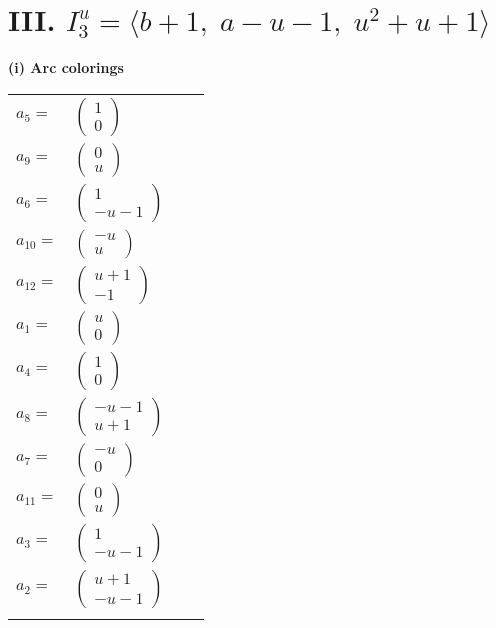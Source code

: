 \documentclass[1p]{elsarticle_modified}
\theoremstyle{definition}
\begin{document}
\centering \section*{III. $I^u_{3}= \langle b+1,\;a- u-1,\;u^2+u+1 \rangle$}
\flushleft \textbf{(i) Arc colorings}\\
\begin{tabular}{m{7pt} m{180pt} m{7pt} m{180pt} }
\flushright $a_{5}=$&$\begin{pmatrix}1\\0\end{pmatrix}$ \\
\flushright $a_{9}=$&$\begin{pmatrix}0\\u\end{pmatrix}$ \\
\flushright $a_{6}=$&$\begin{pmatrix}1\\- u-1\end{pmatrix}$ \\
\flushright $a_{10}=$&$\begin{pmatrix}- u\\u\end{pmatrix}$ \\
\flushright $a_{12}=$&$\begin{pmatrix}u+1\\-1\end{pmatrix}$ \\
\flushright $a_{1}=$&$\begin{pmatrix}u\\0\end{pmatrix}$ \\
\flushright $a_{4}=$&$\begin{pmatrix}1\\0\end{pmatrix}$ \\
\flushright $a_{8}=$&$\begin{pmatrix}- u-1\\u+1\end{pmatrix}$ \\
\flushright $a_{7}=$&$\begin{pmatrix}- u\\0\end{pmatrix}$ \\
\flushright $a_{11}=$&$\begin{pmatrix}0\\u\end{pmatrix}$ \\
\flushright $a_{3}=$&$\begin{pmatrix}1\\- u-1\end{pmatrix}$ \\
\flushright $a_{2}=$&$\begin{pmatrix}u+1\\- u-1\end{pmatrix}$\\&\end{tabular}
\end{document}
